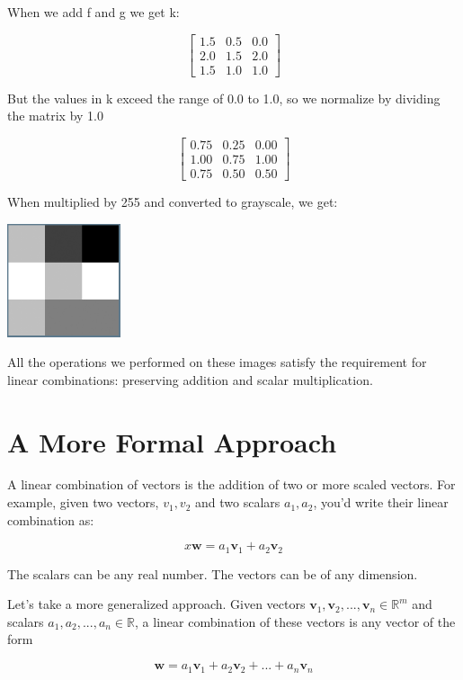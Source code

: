 When we add f and g we get k:

$$\begin{bmatrix}
1.5 & 0.5 & 0.0\\
2.0 & 1.5 & 2.0\\
1.5 & 1.0 & 1.0 
\end{bmatrix}$$

But the values in k exceed the range of 0.0 to 1.0, so we normalize by dividing the matrix by 1.0

$$\begin{bmatrix}
0.75 & 0.25 & 0.00\\
1.00 & 0.75 & 1.00\\
0.75 & 0.50 & 0.50  
\end{bmatrix}$$

When multiplied by 255 and converted to grayscale, we get:

\includegraphics[width=0.25\textwidth]{fgBitmapAdded.png}

All the operations we performed on these images satisfy the requirement for linear combinations: preserving addition and scalar multiplication. 

\section{A More Formal Approach}
A linear combination of vectors is the addition of two or more scaled vectors. For example, given two vectors, ${v}_1, {v}_2$ and two scalars $a_1,a_2$, you'd write their linear combination as:

\[x
\mathbf{w} = a_1\mathbf{v}_1 + a_2\mathbf{v}_2
\]

The scalars can be any real number. The vectors can be of any dimension. 

Let's take a more generalized approach. Given vectors $\mathbf{v}_1,
\mathbf{v}_2, ..., \mathbf{v}_n \in \mathbb{R}^m$ and scalars $a_1,
a_2, ..., a_n \in \mathbb{R}$, a linear combination of these vectors
is any vector of the form

\[
\mathbf{w} = a_1\mathbf{v}_1 + a_2\mathbf{v}_2 + ... + a_n\mathbf{v}_n
\]


